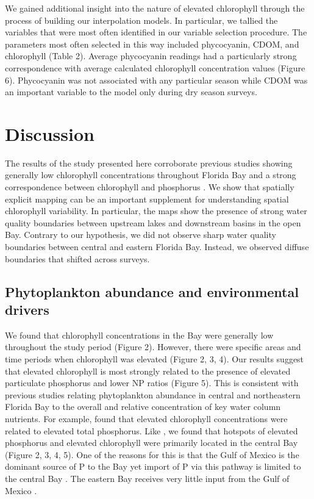 We gained additional insight into the nature of elevated chlorophyll through the process of building our interpolation models. In particular, we tallied the variables that were most often identified in our variable selection procedure. The parameters most often selected in this way included phycocyanin, CDOM, and chlorophyll (Table 2). Average phycocyanin readings had a particularly strong correspondence with average calculated chlorophyll concentration values (Figure 6). Phycocyanin was not associated with any particular season while CDOM was an important variable to the model only during dry season surveys.

\section{Discussion}
\label{discussion}

The results of the study presented here corroborate previous studies showing generally low chlorophyll concentrations throughout Florida Bay and a strong correspondence between chlorophyll and phosphorus \citep{fourqurean1993process, phlips_spatial_1996}. We show that spatially explicit mapping can be an important supplement for understanding spatial chlorophyll variability. In particular, the maps show the presence of strong water quality boundaries between upstream lakes and downstream basins in the open Bay. Contrary to our hypothesis, we did not observe sharp water quality boundaries between central and eastern Florida Bay. Instead, we observed diffuse boundaries that shifted across surveys.

\subsection{Phytoplankton abundance and environmental drivers}
\label{phytoabund}

We found that chlorophyll concentrations in the Bay were generally low throughout the study period (Figure 2). However, there were specific areas and time periods when chlorophyll was elevated (Figure 2, 3, 4). Our results suggest that elevated chlorophyll is most strongly related to the presence of elevated particulate phosphorus and lower NP ratios (Figure 5). This is consistent with previous studies relating phytoplankton abundance in central and northeastern Florida Bay to the overall and relative concentration of key water column nutrients. For example, \citet{fourqurean1993process} found that elevated chlorophyll concentrations were related to elevated total phosphorus. Like \citet{fourqurean1993process}, we found that hotspots of elevated phosphorus and elevated chlorophyll were primarily located in the central Bay (Figure 2, 3, 4, 5). One of the reasons for this is that the Gulf of Mexico is the dominant source of P to the Bay yet import of P via this pathway is limited to the central Bay \citep{childers_relating_2006, rudnick1999phosphorus}. The eastern Bay receives very little input from the Gulf of Mexico \citep{lee2016circulation}. 


